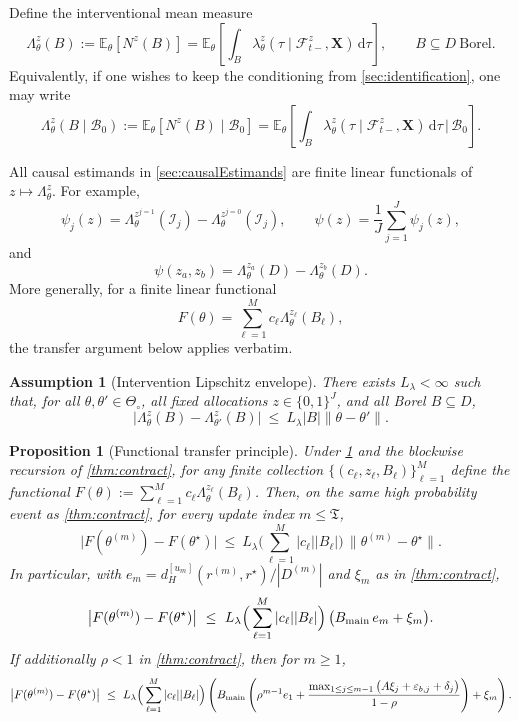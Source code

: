 \documentclass{statsoc}
\newtheorem{proposition}[proposition]{Proposition}
\newtheorem{assumption}[assumption]{Assumption}
\newcommand{\bbE}{\mathbb{E}}
\newcommand{\dd}{\mathrm{d}}
\newcommand{\1}{\mathbbm{1}}
\newcommand{\CovX}{\mathbf{X}}
\newcommand{\Nproc}{N}
\newcommand{\Tmax}{\mathfrak{T}}
\begin{document}
Define the interventional mean measure
\[
\Lambda_\theta^z(B)
:=
\bbE_\theta\!\left[\Nproc^z(B)\right]
=
\bbE_\theta\!\left[
\int_B \lambda_\theta^z(\tau\mid \mathcal F_{t-}^z,\CovX)\,\dd\tau
\right],
\qquad B\subseteq D\ \text{Borel}.
\]
Equivalently, if one wishes to keep the conditioning from \cref{sec:identification}, one may write
\[
\Lambda_\theta^z(B\mid \mathcal B_0)
:=
\bbE_\theta\!\left[\Nproc^z(B)\mid \mathcal B_0\right]
=
\bbE_\theta\!\left[
\int_B \lambda_\theta^z(\tau\mid \mathcal F_{t-}^z,\CovX)\,\dd\tau
\,\Big|\, \mathcal B_0
\right].
\]

All causal estimands in \cref{sec:causalEstimands} are finite linear functionals of \(z\mapsto \Lambda_\theta^z\). For example,
\[
\psi_j(z)=\Lambda_\theta^{z^{j=1}}(\mathcal I_j)-\Lambda_\theta^{z^{j=0}}(\mathcal I_j),
\qquad
\psi(z)=\frac{1}{J}\sum_{j=1}^J \psi_j(z),
\]
and
\[
\psi(z_a,z_b)
=
\Lambda_\theta^{z_a}(D)-\Lambda_\theta^{z_b}(D).
\]
More generally, for a finite linear functional
\[
F(\theta)=\sum_{\ell=1}^M c_\ell \Lambda_\theta^{z_\ell}(B_\ell),
\]
the transfer argument below applies verbatim.

\begin{assumption}[Intervention Lipschitz envelope]\label{ass:Lambda-Lip}
There exists \(L_\lambda<\infty\) such that, for all \(\theta,\theta'\in\Theta_\circ\), all fixed allocations \(z\in\{0,1\}^J\),
and all Borel \(B\subseteq D\),
\begin{equation}\label{eq:Lambda-Lip}
\big| \Lambda_\theta^z(B)-\Lambda_{\theta'}^z(B) \big|
\ \le\ L_\lambda |B| \|\theta-\theta'\|.
\end{equation}
\end{assumption}

\begin{proposition}[Functional transfer principle]\label{prop:transfer-functional}
Under \cref{ass:Lambda-Lip} and the blockwise recursion of \cref{thm:contract}, for any finite collection
$\{(c_\ell,z_\ell,B_\ell)\}_{\ell=1}^M$ define the functional
$F(\theta):=\sum_{\ell=1}^M c_\ell \Lambda_\theta^{z_\ell}(B_\ell)$.
Then, on the same high probability event as \cref{thm:contract}, for every update index $m\le \Tmax$,
\[
\big| F(\theta^{(m)})-F(\theta^\star) \big|
\ \le\ L_\lambda \Big(\sum_{\ell=1}^M |c_\ell| |B_\ell|\Big)\,\|\theta^{(m)}-\theta^\star\|.
\]
In particular, with $e_m=d_H^{[u_m]}(r^{(m)},r^\star)/|D^{(m)}|$ and $\xi_m$ as in \cref{thm:contract},
\[
\big| F(\theta^{(m)})-F(\theta^\star) \big|
\ \le\ L_\lambda \Big(\sum_{\ell=1}^M |c_\ell| |B_\ell|\Big)\,\big(B_{\rm main}\,e_m+\xi_m\big).
\]
If additionally $\rho<1$ in \cref{thm:contract}, then for $m\ge 1$,
\[
\big| F(\theta^{(m)})-F(\theta^\star) \big|
\ \le\ L_\lambda \Big(\sum_{\ell=1}^M |c_\ell| |B_\ell|\Big)\left(
B_{\rm main}\left(\rho^{m-1}e_1+\frac{\max_{1\le j\le m-1}\big(A\xi_j+\varepsilon_{b,j}+\delta_j\big)}{1-\rho}\right)+\xi_m\right).
\]
\end{proposition}
\end{document}
